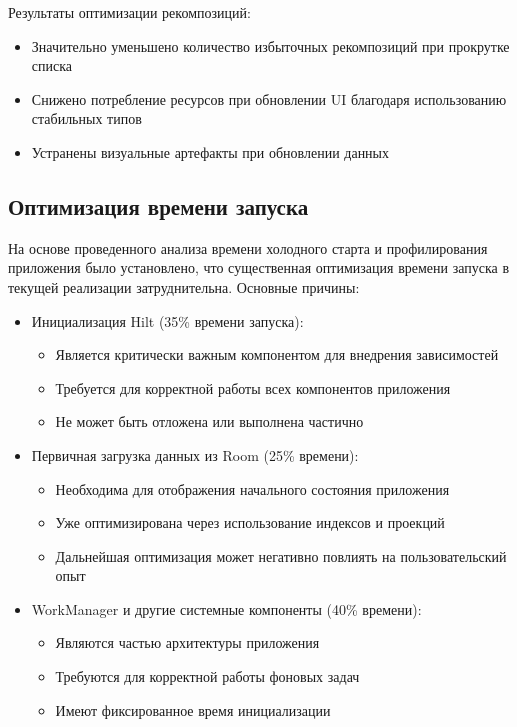 \documentclass[14pt, russian]{scrartcl}
\begin{document}
Результаты оптимизации рекомпозиций:
\begin{itemize}
\item Значительно уменьшено количество избыточных рекомпозиций при прокрутке списка
\item Снижено потребление ресурсов при обновлении UI благодаря использованию стабильных типов
\item Устранены визуальные артефакты при обновлении данных
\end{itemize}

\subsection{Оптимизация времени запуска}\label{sect:startup-optimization}

На основе проведенного анализа времени холодного старта и профилирования приложения было установлено, что существенная оптимизация времени запуска в текущей реализации затруднительна. Основные причины:

\begin{itemize}
\item Инициализация Hilt (35\% времени запуска):
  \begin{itemize}
  \item Является критически важным компонентом для внедрения зависимостей
  \item Требуется для корректной работы всех компонентов приложения
  \item Не может быть отложена или выполнена частично
  \end{itemize}

\item Первичная загрузка данных из Room (25\% времени):
  \begin{itemize}
  \item Необходима для отображения начального состояния приложения
  \item Уже оптимизирована через использование индексов и проекций
  \item Дальнейшая оптимизация может негативно повлиять на пользовательский опыт
  \end{itemize}

\item WorkManager и другие системные компоненты (40\% времени):
  \begin{itemize}
  \item Являются частью архитектуры приложения
  \item Требуются для корректной работы фоновых задач
  \item Имеют фиксированное время инициализации
  \end{itemize}
\end{itemize}
\end{document}
